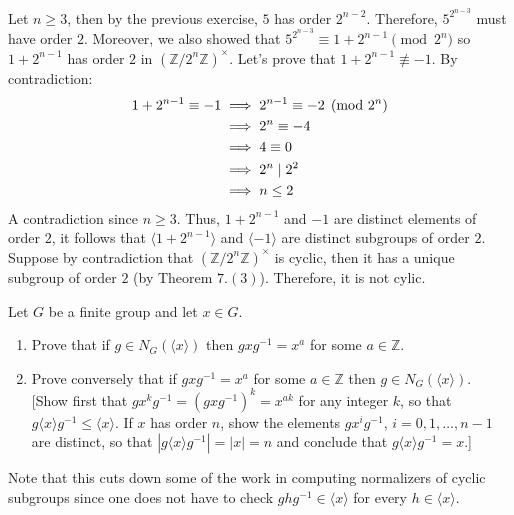 \begin{solution}
    \\Let $n \geq 3$, then by the previous exercise, $5$ has order $2^{n-2}$. Therefore, $5^{2^{n-3}}$ must have order $2$. Moreover, we also showed that $5^{2^{n-3}} \equiv 1 + 2^{n-1} \pmod{2^n}$ so $1+2^{n-1}$ has order $2$ in $(\mathbb{Z}/2^n\mathbb{Z})^{\times}$. Let's prove that $1+2^{n-1} \not\equiv -1$. By contradiction:
    \begin{align*}
        1+2^{n-1} \equiv -1 &\implies 2^{n-1} \equiv -2 \pmod{2^n}\\
        &\implies 2^n \equiv -4\\
        &\implies 4 \equiv 0\\
        &\implies 2^n \mathrel{|} 2^2 \\
        &\implies n \leq 2
    \end{align*}
    A contradiction since $n \geq 3$. Thus, $1+2^{n-1}$ and $-1$ are distinct elements of order $2$, it follows that $\langle 1 + 2^{n-1} \rangle$ and $\langle -1 \rangle$ are distinct subgroups of order $2$. Suppose by contradiction that $(\mathbb{Z}/2^n\mathbb{Z})^{\times}$ is cyclic, then it has a unique subgroup of order $2$ (by Theorem $7.(3)$). Therefore, it is not cylic. \\
\end{solution}

\begin{exercise}
    Let $G$ be a finite group and let $x \in G$.
    \begin{enumerate}[label = \textbf{(\alph*)}]
        \item Prove that if $g\in N_G(\langle x \rangle)$ then $gxg^{-1}=x^a$ for some $a \in \mathbb{Z}$.
        \item Prove conversely that if $gxg^{-1} = x^a$ for some $a\in \mathbb{Z}$ then $g\in N_G(\langle x \rangle)$. [Show first that $gx^kg^{-1} = (gxg^{-1})^k = x^{ak}$ for any integer $k$, so that $g\langle x \rangle g^{-1} \leq \langle x \rangle$. If $x$ has order $n$, show the elements $gx^ig^{-1}$, $i=0,1,\dots ,n-1$ are distinct, so that $|g\langle x \rangle g^{-1}|= |x|=n$ and conclude that $g\langle x \rangle g^{-1}= x$.]
    \end{enumerate}
    Note that this cuts down some of the work in computing normalizers of cyclic subgroups since one does not have to check $ghg^{-1} \in \langle x \rangle$ for every $h \in \langle x \rangle$.\\
\end{exercise}

